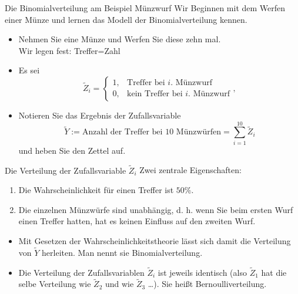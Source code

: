 \documentclass[usenames,dvipsnames,handout]{beamer}
\begin{document}
\begin{frame}{Die Binomialverteilung am Beispiel Münzwurf}%
Wir Beginnen mit dem Werfen einer Münze und lernen das Modell der Binomialverteilung kennen. 
\begin{itemize}
\item{Nehmen Sie eine Münze und Werfen Sie diese zehn mal.\\ Wir legen fest: Treffer=Zahl}
\item{Es sei 
  \[
     \tilde{Z}_{i}=\left\{\begin{array}{ll} 1, & \text{Treffer bei $i.$ Münzwurf } \\
         0, &  \text{kein Treffer bei $i.$ Münzwurf}\end{array}\right.,
  \]
}
\item{Notieren Sie das Ergebnis der Zufallsvariable 
\begin{equation*}
\tilde{Y} := \text{Anzahl der Treffer bei $10$ Münzwürfen}=\sum_{i=1}^{10} \tilde{Z}_{i}
\end{equation*}
und heben Sie den Zettel auf.
}
\end{itemize}
\end{frame}

\begin{frame}{Die Verteilung der Zufallsvariable $\tilde{Z}_{i}$}
Zwei zentrale Eigenschaften:
\begin{enumerate}
\item{Die Wahrscheinlichkeit für einen Treffer ist $50\%.$}
\item{Die einzelnen Münzwürfe sind unabhängig, d. h. wenn Sie beim ersten Wurf einen Treffer
hatten, hat es keinen Einfluss auf den zweiten Wurf.}\pause
\end{enumerate}
\begin{itemize}
\item{Mit Gesetzen der Wahrscheinlichkeitstheorie lässt sich damit die Verteilung von $\tilde{Y}$ herleiten. 
Man nennt sie Binomialverteilung.}
\item{Die Verteilung der Zufallsvariablen $\tilde{Z}_{i}$ ist jeweils identisch (also 
$\tilde{Z}_{1}$ hat die selbe Verteilung wie $\tilde{Z}_{2}$ und wie $\tilde{Z}_{3}$ \dots). Sie heißt Bernoulliverteilung.}
\end{itemize}
\end{frame}
\end{document}
